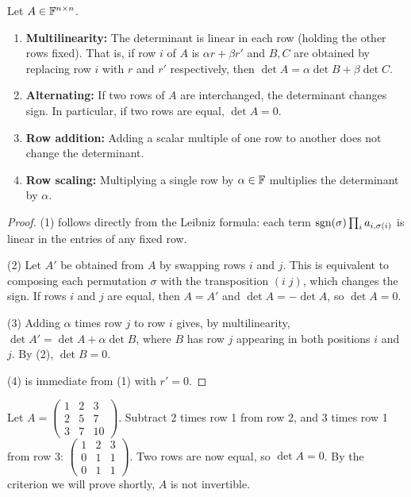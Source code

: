 \documentclass[11pt,a4paper]{article}
\begin{document}
\begin{proposition}
\label{prop:det_row_ops}
Let $A \in \mathbb{F}^{n \times n}$.
\begin{enumerate}[nosep]
  \item \textbf{Multilinearity:} The determinant is linear in each row
        (holding the other rows fixed).  That is, if row $i$ of $A$ is
        $\alpha r + \beta r'$ and $B, C$ are obtained by replacing row $i$
        with $r$ and $r'$ respectively, then $\det A = \alpha \det B + \beta \det C$.
  \item \textbf{Alternating:} If two rows of $A$ are interchanged, the
        determinant changes sign.  In particular, if two rows are equal,
        $\det A = 0$.
  \item \textbf{Row addition:} Adding a scalar multiple of one row to
        another does not change the determinant.
  \item \textbf{Row scaling:} Multiplying a single row by $\alpha \in \mathbb{F}$
        multiplies the determinant by $\alpha$.
\end{enumerate}
\end{proposition}

\begin{proof}
(1) follows directly from the Leibniz formula: each term
$\operatorname{sgn}(\sigma) \prod_i a_{i,\sigma(i)}$ is linear in the entries of any
fixed row.

(2) Let $A'$ be obtained from $A$ by swapping rows $i$ and $j$.  This is
equivalent to composing each permutation $\sigma$ with the transposition
$(i\;j)$, which changes the sign.  If rows $i$ and $j$ are equal, then
$A = A'$ and $\det A = -\det A$, so $\det A = 0$.

(3) Adding $\alpha$ times row $j$ to row $i$ gives, by multilinearity,
$\det A' = \det A + \alpha \det B$, where $B$ has row $j$ appearing in
both positions $i$ and $j$.  By (2), $\det B = 0$.

(4) is immediate from (1) with $r' = 0$.
\end{proof}

\begin{example}
\label{ex:det_row_reduction}
Let $A = \begin{pmatrix} 1 & 2 & 3 \\ 2 & 5 & 7 \\ 3 & 7 & 10 \end{pmatrix}$.
Subtract 2 times row 1 from row 2, and 3 times row 1 from row 3:
$\begin{pmatrix} 1 & 2 & 3 \\ 0 & 1 & 1 \\ 0 & 1 & 1 \end{pmatrix}$.
Two rows are now equal, so $\det A = 0$.  By the criterion we will prove
shortly, $A$ is not invertible.
\end{example}
\end{document}
